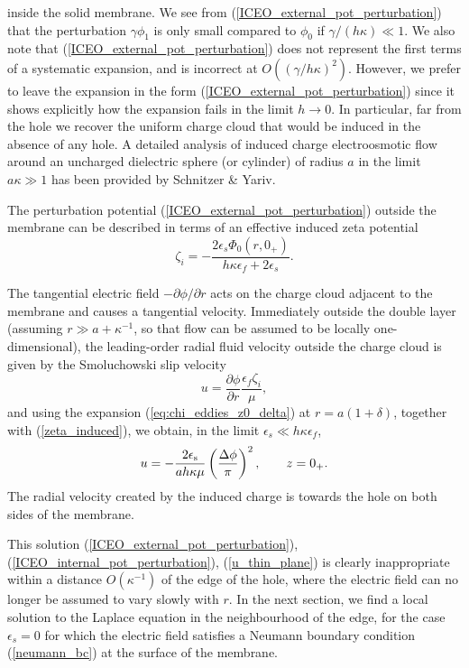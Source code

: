 inside the solid membrane. We see from (\ref{ICEO_external_pot_perturbation})
that the perturbation $\gamma\phi_1$ is only small compared to $\phi_0$
if $\gamma/(h\kappa)\ll 1$. 
We also note that
(\ref{ICEO_external_pot_perturbation})
does not represent the first terms of a systematic expansion,
and is incorrect at $O((\gamma/h\kappa)^2)$.
However, we prefer to leave the expansion in
the form (\ref{ICEO_external_pot_perturbation}) since it shows explicitly
how the expansion fails in the limit $h\rightarrow 0$.
In particular, far from the hole we recover the
uniform charge cloud that would be induced in the absence of any hole.
A detailed analysis
of induced charge electroosmotic flow around
an uncharged dielectric
sphere (or cylinder)
of radius $a$ in the limit $a\kappa\gg 1$ has been provided by Schnitzer \&
Yariv\cite{schnitzer2014strong}.

The perturbation potential (\ref{ICEO_external_pot_perturbation})
outside the membrane can be described in terms of an
effective induced zeta potential
\begin{equation}
\zeta_i=-\frac{2\epsilon_s\Phi_0(r,0_+)}{h\kappa\epsilon_f+2\epsilon_s}.
\label{zeta_induced}
\end{equation}

The tangential electric field $-\partial\phi/\partial r$ acts on
the charge cloud adjacent to the membrane and causes a tangential
velocity. Immediately outside the double layer
(assuming $r\gg a+\kappa^{-1}$, so that
flow can be assumed to be locally one-dimensional), the leading-order 
radial fluid
velocity outside the charge cloud is given by the Smoluchowski slip velocity
\begin{equation}
u=\frac{\partial\phi}{\partial r}\frac{\epsilon_f\zeta_i}{\mu},
\end{equation}
and using the expansion (\ref{eq:chi_eddies_z0_delta}) at $r=a(1+\delta)$,
together with
(\ref{zeta_induced}), we obtain, in the limit $\epsilon_s\ll h\kappa\epsilon_f$,
\begin{equation}
u=-\frac{2\epsilon_\text{s}}{ah\kappa\mu}\left(\frac{\Delta\phi}{\pi}\right)^2
,\hskip 20pt z=0_+.
\label{u_thin_plane}
\end{equation}
The radial velocity created by the induced charge is towards the hole
on both sides of the membrane.

This solution (\ref{ICEO_external_pot_perturbation}),
(\ref{ICEO_internal_pot_perturbation}), (\ref{u_thin_plane})
is clearly inappropriate within a distance $O(\kappa^{-1})$ of the
edge of the hole, where the electric field can
no longer be assumed to vary slowly with $r$.
In the next section, we find a local solution
to the Laplace equation in the neighbourhood of the edge,
for the case $\epsilon_s=0$ for which the electric field
satisfies a Neumann boundary condition (\ref{neumann_bc})
at the surface of the membrane.

